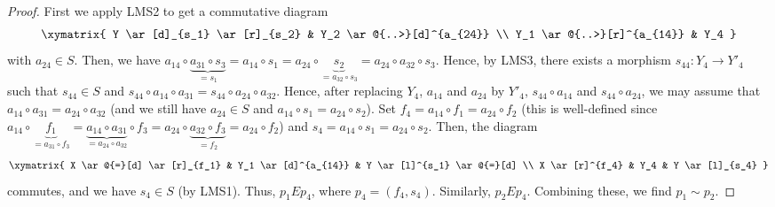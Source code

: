 \begin{proof}
First we apply LMS2 to get a commutative diagram
$$
\xymatrix{
Y \ar[d]_{s_1} \ar[r]_{s_2} & Y_2 \ar@{..>}[d]^{a_{24}} \\
Y_1 \ar@{..>}[r]^{a_{14}} & Y_4
}
$$
with $a_{24} \in S$. Then, we have
$a_{14} \circ \underbrace{a_{31} \circ s_3}_{= s_1}
= a_{14} \circ s_1
= a_{24} \circ \underbrace{s_2}_{= a_{32} \circ s_3}
= a_{24} \circ a_{32} \circ s_3$. Hence, by LMS3, there exists a
morphism $s_{44} : Y_4 \to Y'_4$ such that $s_{44} \in S$ and
$s_{44} \circ a_{14} \circ a_{31}
= s_{44} \circ a_{24} \circ a_{32}$.
Hence, after replacing $Y_4$, $a_{14}$ and $a_{24}$ by $Y'_4$,
$s_{44} \circ a_{14}$ and $s_{44} \circ a_{24}$, we may assume
that $a_{14} \circ a_{31} = a_{24} \circ a_{32}$ (and
we still have $a_{24} \in S$ and
$a_{14} \circ s_1 = a_{24} \circ s_2$). Set
$f_4 = a_{14} \circ f_1 = a_{24} \circ f_2$ (this is well-defined
since $a_{14} \circ \underbrace{f_1}_{= a_{31} \circ f_3}
= \underbrace{a_{14} \circ a_{31}}_{= a_{24} \circ a_{32}} \circ f_3
= a_{24} \circ \underbrace{a_{32} \circ f_3}_{= f_2}
= a_{24} \circ f_2$) and
$s_4 = a_{14} \circ s_1 = a_{24} \circ s_2$. Then, the diagram
$$
\xymatrix{
X \ar@{=}[d] \ar[r]_{f_1} & Y_1 \ar[d]^{a_{14}} & Y \ar[l]^{s_1} \ar@{=}[d] \\
X \ar[r]^{f_4} & Y_4 & Y \ar[l]_{s_4}
}
$$
commutes, and we have $s_4 \in S$ (by LMS1). Thus, $p_1 E p_4$,
where $p_4 = (f_4, s_4)$. Similarly, $p_2 E p_4$. Combining these,
we find $p_1 \sim p_2$.



\end{proof}
